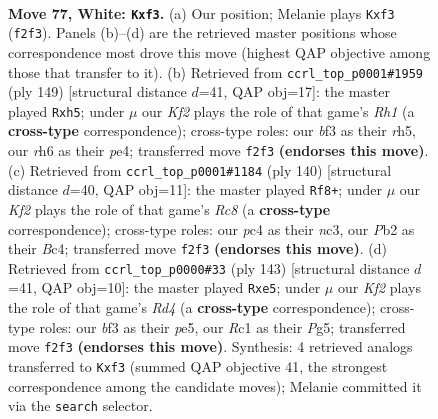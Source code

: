 \documentclass[11pt]{article}
\begin{document}
\clearpage

\begin{figure}[p]\centering
\begin{subfigure}{0.46\textwidth}\centering
\resizebox{\linewidth}{!}{%
\newchessgame
\chessboard[
  setfen={8/3k4/p6r/Ppp2p1p/2p2P1P/4PbP1/1P3K2/2R5 w - - 0 77},
  showmover=false,
  pgfstyle=straightmove, color=movearrow, markmove={f2-f3}
]}
\caption{}
\end{subfigure}\hfill
\begin{subfigure}{0.46\textwidth}\centering
\resizebox{\linewidth}{!}{%
\newchessgame
\chessboard[
  setfen={7r/4kp2/3p1p2/p1p2P1R/P1P1P1R1/1P6/4K3/8 b - - 0 75},
  showmover=false,
  pgfstyle=straightmove, color=movearrow, markmove={h8-h5}
]}
\caption{}
\end{subfigure}
\\[4pt]
\begin{subfigure}{0.46\textwidth}\centering
\resizebox{\linewidth}{!}{%
\newchessgame
\chessboard[
  setfen={2R5/2pr4/1p3kp1/5p1p/1PB4P/2n1P1P1/5PK1/8 w - - 7 71},
  showmover=false,
  pgfstyle=straightmove, color=movearrow, markmove={c8-f8}
]}
\caption{}
\end{subfigure}\hfill
\begin{subfigure}{0.46\textwidth}\centering
\resizebox{\linewidth}{!}{%
\newchessgame
\chessboard[
  setfen={8/5p2/1K2k1p1/1p1rP1p1/pP4P1/P1R2P2/8/8 b - - 14 72},
  showmover=false,
  pgfstyle=straightmove, color=movearrow, markmove={d5-e5}
]}
\caption{}
\end{subfigure}
\caption{\textbf{Move 77, White: \texttt{Kxf3}.} (a) Our position; Melanie plays \texttt{Kxf3} (\texttt{f2f3}). Panels (b)--(d) are the retrieved master positions whose correspondence most drove this move (highest QAP objective among those that transfer to it). (b) Retrieved from \texttt{ccrl\_top\_p0001\#1959} (ply 149) [structural distance $d$=41, QAP obj=17]: the master played \texttt{Rxh5}; under $\mu$ our \emph{Kf2} plays the role of that game's \emph{Rh1} (a \textbf{cross-type} correspondence); cross-type roles: our \emph{b}f3 as their \emph{r}h5, our \emph{r}h6 as their \emph{p}e4; transferred move \texttt{f2f3} \textbf{(endorses this move)}. (c) Retrieved from \texttt{ccrl\_top\_p0001\#1184} (ply 140) [structural distance $d$=40, QAP obj=11]: the master played \texttt{Rf8+}; under $\mu$ our \emph{Kf2} plays the role of that game's \emph{Rc8} (a \textbf{cross-type} correspondence); cross-type roles: our \emph{p}c4 as their \emph{n}c3, our \emph{P}b2 as their \emph{B}c4; transferred move \texttt{f2f3} \textbf{(endorses this move)}. (d) Retrieved from \texttt{ccrl\_top\_p0000\#33} (ply 143) [structural distance $d$=41, QAP obj=10]: the master played \texttt{Rxe5}; under $\mu$ our \emph{Kf2} plays the role of that game's \emph{Rd4} (a \textbf{cross-type} correspondence); cross-type roles: our \emph{b}f3 as their \emph{p}e5, our \emph{R}c1 as their \emph{P}g5; transferred move \texttt{f2f3} \textbf{(endorses this move)}. Synthesis: 4 retrieved analogs transferred to \texttt{Kxf3} (summed QAP objective 41, the strongest correspondence among the candidate moves); Melanie committed it via the \texttt{search} selector.}
\label{fig:thought-m152}
\end{figure}
\end{document}

